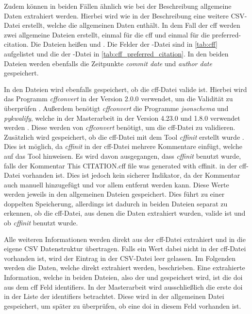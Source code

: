 Zudem können in beiden Fällen ähnlich wie bei der Beschreibung allgemeine Daten extrahiert werden.
Hierbei wird wie in der Beschreibung eine weitere CSV-Datei erstellt, welche die allgemeinen Daten enthält.
In dem Fall der \gls{cff} werden zwei allgemeine Dateien erstellt, einmal für die \gls{cff} und einmal für die \glqq preferred-citation\grqq{}.
Die Dateien heißen  und .
Die Felder der -Datei sind in \autoref{tab:cff} aufgelistet und die der -Datei in \autoref{tab:cff_preferred_citation}.
In den beiden Dateien werden ebenfalls die Zeitpunkte \emph{commit date} und \emph{author date} gespeichert.

In den Dateien wird ebenfalls gespeichert, ob die \gls{cff}-Datei valide ist.
Hierbei wird das Programm \emph{cffconvert} in der Version 2.0.0 verwendet, um die Validität zu überprüfen \autocite{spaaks_cffconvert_2021}.
Außerdem benötigt \emph{cffconvert} die Programme \emph{jsonschema} und \emph{pykwalify}, welche in der Masterarbeit in der Version 4.23.0 und 1.8.0 verwendet werden \autocites{berman_jsonschema_2024}{grokzen_pykwalify_2020}.
Diese werden von \emph{cffconvert} benötigt, um die \gls{cff}-Datei zu validieren.
Zusätzlich wird gespeichert, ob die \gls{cff}-Datei mit dem Tool \emph{cffinit} erstellt wurde \autocite{spaaks_cffinit_2023}.
Dies ist möglich, da \emph{cffinit} in der \gls{cff}-Datei mehrere Kommentare einfügt, welche auf das Tool hinweisen.
Es wird davon ausgegangen, dass \emph{cffinit} benutzt wurde, falls der Kommentar \glqq This CITATION.cff file was generated with cffinit.\grqq{} in der \gls{cff}-Datei vorhanden ist.
Dies ist jedoch kein sicherer Indikator, da der Kommentar auch manuell hinzugefügt und vor allem entfernt werden kann.
Diese Werte werden jeweils in den allgemeinen Dateien gespeichert.
Dies führt zu einer doppelten Speicherung, allerdings ist dadurch in beiden Dateien separat zu erkennen, ob die \gls{cff}-Datei, aus denen die Daten extrahiert wurden, valide ist und ob \emph{cffinit} benutzt wurde.

Alle weiteren Informationen werden direkt aus der \gls{cff}-Datei extrahiert und in die eigene CSV Datenstruktur übertragen.
Falls ein Wert dabei nicht in der \gls{cff}-Datei vorhanden ist, wird der Eintrag in der CSV-Datei leer gelassen.
Im Folgenden werden die Daten, welche direkt extrahiert werden, beschrieben.
Eine extrahierte Information, welche in beiden Dateien, also der  und  gespeichert wird, ist die \gls{doi} aus dem \gls{cff} Feld \glqq identifiers\grqq{}.
In der Masterarbeit wird ausschließlich die erste \gls{doi} in der Liste der \glqq identifiers\grqq{} betrachtet.
Diese wird in der allgemeinen Datei gespeichert, um später zu überprüfen, ob eine \gls{doi} in diesem Feld vorhanden ist.

